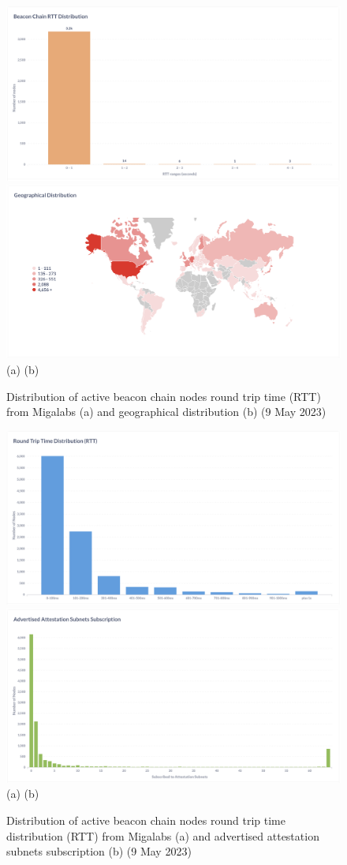 \documentclass[UTF8]{article}
\begin{document}
{\begin{figure}[htbp]
\begin{center}
\includegraphics[width=0.48\linewidth]{images/activertt}
\includegraphics[width=0.48\linewidth]{images/geographical} \\
(a)\hspace{160pt}        (b)\\
\caption{Distribution of active beacon chain nodes round trip time (RTT) from Migalabs (a) and geographical distribution (b) (9 May 2023)}
\label{fig:rtt}
\end{center}
\end{figure}

\begin{figure}[htbp]
\begin{center}
\includegraphics[width=0.48\linewidth]{images/rttdist}
\includegraphics[width=0.48\linewidth]{images/aass} \\
(a)\hspace{160pt}        (b)\\
\caption{Distribution of active beacon chain nodes round trip time distribution (RTT) from Migalabs (a) and advertised attestation subnets subscription (b) (9 May 2023)}
\label{fig:aass}
\end{center}
\end{figure}

}
\end{document}

